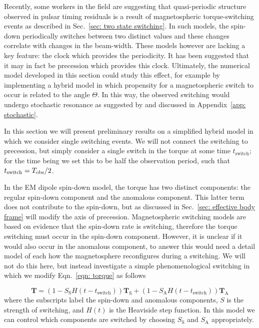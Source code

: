 \documentclass[../full_thesis/full_thesis.tex]{subfiles}
\begin{document}
Recently, some workers in the field \citep{Lyne2010, Perera2015} are suggesting
that quasi-periodic structure observed in pulsar timing residuals is a result
of magnetospheric torque-switching events as described in Sec.~\ref{sec: two
state switching}. In such models, the spin-down periodically switches between
two distinct values and these changes correlate with changes in the beam-width.
These models however are lacking a key feature: the clock which provides the
periodicity. It has been suggested \citep{Jones2012} that it may in fact be
precession which provides this clock. Ultimately, the numerical model developed
in this section could study this effect, for example by implementing a hybrid
model in which propensity for a magnetospheric switch to occur is related to
the angle $\Theta$. In this way, the observed switching would undergo
stochastic resonance as suggested by \citet{Cordes2013} and discussed in Appendix~\ref{app:
stochastic}.

In this section we will present preliminary results on a simplified hybrid model
in which we consider single switching events. We will not connect the switching
to precession, but simply consider a single switch in the torque at some time
$t_{\mathrm{switch}}$; for the time being we set this to be half the
observation period, such that $t_{\mathrm{switch}} = T_{\textrm{obs}}/2$.

In the EM dipole spin-down model, the torque has two distinct components: the
regular spin-down component and the anomalous component. This latter term
does not contribute to the spin-down, but as discussed in Sec.~\ref{sec: effective
body frame} will modify the axis of precession. Magnetospheric switching models
are based on evidence that the spin-down rate is switching, therefore the torque
switching must occur in the spin-down component. However, it is unclear if it would
also occur in the anomalous component, to answer this would need a detail model
of each how the magnetosphere reconfigures during a switching. We will not do
this here, but instead investigate a simple phenomenological switching in which we
modify Eqn.~\eqref{eqn: torque} as follows
\newcommand{\Ss}{S_{\mathrm{S}}}
\newcommand{\Sa}{S_{\mathrm{A}}}

\begin{equation}
\mathbf{T} = (1 - \Ss H(t-t_{\mathrm{switch}})) \mathbf{T}_{\mathrm{S}}+
                 (1 - \Sa H(t-t_{\mathrm{switch}})) \mathbf{T}_{\mathrm{A}}
\label{eqn: single switch torque}
\end{equation}
where the subscripts label the spin-down and anomalous components, $S$ is the
strength of switching, and $H(t)$ is the Heaviside step function. In this model
we can control which components are switched by choosing $\Ss$ and $\Sa$
appropriately.
\end{document}
